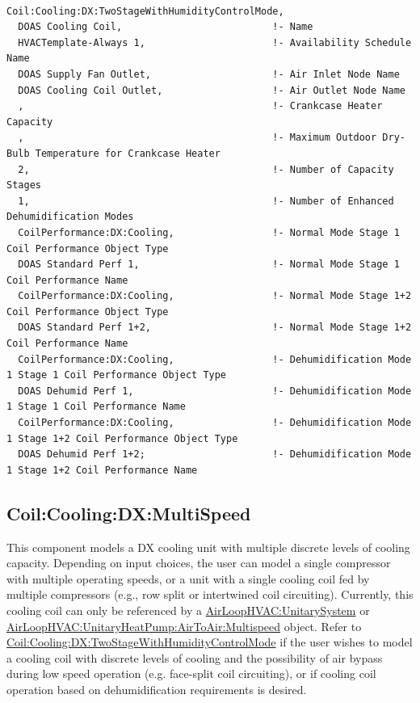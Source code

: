 \begin{lstlisting}

Coil:Cooling:DX:TwoStageWithHumidityControlMode,
  DOAS Cooling Coil,                          !- Name
  HVACTemplate-Always 1,                      !- Availability Schedule Name
  DOAS Supply Fan Outlet,                     !- Air Inlet Node Name
  DOAS Cooling Coil Outlet,                   !- Air Outlet Node Name
  ,                                           !- Crankcase Heater Capacity
  ,                                           !- Maximum Outdoor Dry-Bulb Temperature for Crankcase Heater
  2,                                          !- Number of Capacity Stages
  1,                                          !- Number of Enhanced Dehumidification Modes
  CoilPerformance:DX:Cooling,                 !- Normal Mode Stage 1 Coil Performance Object Type
  DOAS Standard Perf 1,                       !- Normal Mode Stage 1 Coil Performance Name
  CoilPerformance:DX:Cooling,                 !- Normal Mode Stage 1+2 Coil Performance Object Type
  DOAS Standard Perf 1+2,                     !- Normal Mode Stage 1+2 Coil Performance Name
  CoilPerformance:DX:Cooling,                 !- Dehumidification Mode 1 Stage 1 Coil Performance Object Type
  DOAS Dehumid Perf 1,                        !- Dehumidification Mode 1 Stage 1 Coil Performance Name
  CoilPerformance:DX:Cooling,                 !- Dehumidification Mode 1 Stage 1+2 Coil Performance Object Type
  DOAS Dehumid Perf 1+2;                      !- Dehumidification Mode 1 Stage 1+2 Coil Performance Name
\end{lstlisting}

\subsection{Coil:Cooling:DX:MultiSpeed}\label{coilcoolingdxmultispeed}

This component models a DX cooling unit with multiple discrete levels of cooling capacity. Depending on input choices, the user can model a single compressor with multiple operating speeds, or a unit with a single cooling coil fed by multiple compressors (e.g., row split or intertwined coil circuiting). Currently, this cooling coil can only be referenced by a \hyperref[airloophvacunitarysystem]{AirLoopHVAC:UnitarySystem} or \hyperref[airloophvacunitaryheatpumpairtoairmultispeed]{AirLoopHVAC:UnitaryHeatPump:AirToAir:Multispeed} object. Refer to \hyperref[coilcoolingdxtwostagewithhumiditycontrolmode]{Coil:Cooling:DX:TwoStageWithHumidityControlMode} if the user wishes to model a cooling coil with discrete levels of cooling and the possibility of air bypass during low speed operation (e.g. face-split coil circuiting), or if cooling coil operation based on dehumidification requirements is desired.

